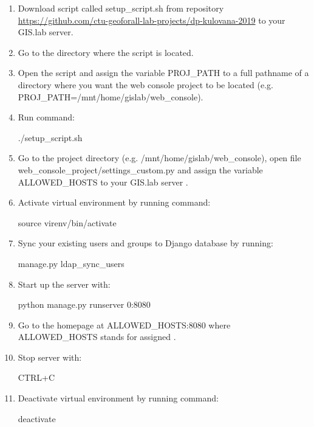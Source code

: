 \begin{enumerate}
\item{Download script called \textsf{setup\_script.sh} from repository
  \href{https://github.com/ctu-geoforall-lab-projects/dp-kulovana-2019}{https://github.com/ctu-geoforall-lab-projects/dp-kulovana-2019}
  to your GIS.lab server.}

\item{Go to the directory where the script is located.}

\item{Open the script and assign the variable \textsf{PROJ\_PATH} to a
  full pathname of a directory where you want the web console project
  to be located \linebreak
  (e.g. \textsf{PROJ\_PATH=/mnt/home/gislab/web\_console}).}

\item{Run command:}
\begin{center}
\textsf{./setup\_script.sh}
\end{center}

\item{Go to the project directory
  (e.g. \textsf{/mnt/home/gislab/web\_console}), open file
  \textsf{web\_console\_project/settings\_custom.py} and assign the
  variable \linebreak\textsf{ALLOWED\_HOSTS} to your GIS.lab server
  .}

\item{Activate virtual environment by running command:}
\begin{center}
\textsf{source virenv/bin/activate}
\end{center}

\item{Sync your existing  users and groups to Django database
  by running:}
\begin{center}
\textsf{manage.py ldap\_sync\_users}
\end{center}

\newpage
\item{Start up the server with:}
\begin{center}
\textsf{python manage.py runserver 0:8080}
\end{center}

\item{Go to the homepage at \textsf{ALLOWED\_HOSTS:8080} where
  \textsf{ALLOWED\_HOSTS} stands for assigned .}

\item{Stop server with:}
\begin{center}
\textsf{CTRL+C}
\end{center}

\item{Deactivate virtual environment by running command:}
\begin{center}
\textsf{deactivate}
\end{center}
\end{enumerate}

